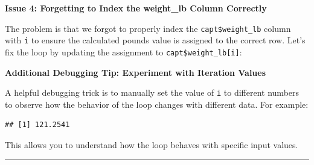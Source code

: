 \documentclass[
]{book}
\newenvironment{Shaded}{\begin{snugshade}}{\end{snugshade}}
\newcommand{\CommentTok}[1]{\textcolor[rgb]{0.56,0.35,0.01}{\textit{#1}}}
\newcommand{\ConstantTok}[1]{\textcolor[rgb]{0.56,0.35,0.01}{#1}}
\newcommand{\ControlFlowTok}[1]{\textcolor[rgb]{0.13,0.29,0.53}{\textbf{#1}}}
\newcommand{\DecValTok}[1]{\textcolor[rgb]{0.00,0.00,0.81}{#1}}
\newcommand{\FloatTok}[1]{\textcolor[rgb]{0.00,0.00,0.81}{#1}}
\newcommand{\FunctionTok}[1]{\textcolor[rgb]{0.13,0.29,0.53}{\textbf{#1}}}
\newcommand{\NormalTok}[1]{#1}
\newcommand{\OtherTok}[1]{\textcolor[rgb]{0.56,0.35,0.01}{#1}}
\newcommand{\SpecialCharTok}[1]{\textcolor[rgb]{0.81,0.36,0.00}{\textbf{#1}}}
\begin{document}
\textbf{Issue 4: Forgetting to Index the weight\_lb Column Correctly}

The problem is that we forgot to properly index the \texttt{capt\$weight\_lb} column with \texttt{i} to ensure the calculated pounds value is assigned to the correct row. Let's fix the loop by updating the assignment to \texttt{capt\$weight\_lb{[}i{]}}:

\begin{Shaded}
\end{Shaded}

\textbf{Additional Debugging Tip: Experiment with Iteration Values}

A helpful debugging trick is to manually set the value of \texttt{i} to different numbers to observe how the behavior of the loop changes with different data. For example:

\begin{Shaded}
\end{Shaded}

\begin{verbatim}
## [1] 121.2541
\end{verbatim}

This allows you to understand how the loop behaves with specific input values.

\begin{center}\rule{0.5\linewidth}{0.5pt}\end{center}
\end{document}
